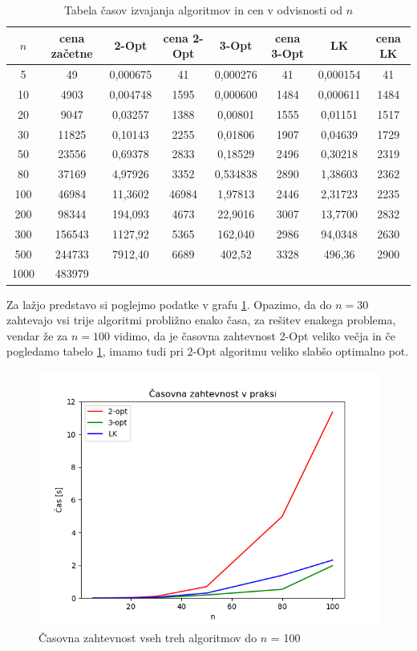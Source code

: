\documentclass[12pt, a4paper]{article}
\begin{document}
\begin{table}[!h]
\begin{tabular}{|c|c|c|c|c|c|c|c|}
\hline
$n$&cena začetne&2-Opt&cena 2-Opt&3-Opt&cena 3-Opt&LK&cena LK\\\hline
5&49&0,000675&41&0,000276&41&0,000154&41\\\hline
10&4903&0,004748&1595&0,000600&1484&0,000611&1484\\\hline
20&9047&0,03257&1388&0,00801&1555&0,01151&1517\\\hline
30&11825&0,10143&2255&0,01806&1907&0,04639&1729\\\hline
50&23556&0,69378&2833&0,18529&2496&0,30218&2319\\\hline
80&37169&4,97926&3352&0,534838&2890&1,38603&2362\\\hline
100&46984&11,3602&46984&1,97813&2446&2,31723&2235\\\hline
200&98344&194,093&4673&22,9016&3007&13,7700&2832\\\hline
300&156543&1127,92&5365&162,040&2986&94,0348&2630\\\hline
500&244733&7912,40&6689&402,52&3328&496,36&2900\\\hline
1000&483979&&&&&&\\\hline
\end{tabular}
\caption{Tabela časov izvajanja algoritmov in cen v odvisnosti od $n$}
\label{tabela_casov}
\end{table}

Za lažjo predstavo si poglejmo podatke v grafu \ref{casovna_do_100}. Opazimo, da do $n=30$ zahtevajo vsi trije algoritmi probližno enako časa, za rešitev enakega problema, vendar že za $n=100$ vidimo, da je časovna zahtevnost 2-Opt veliko večja in če pogledamo tabelo \ref{tabela_casov}, imamo tudi pri 2-Opt algoritmu veliko slabšo optimalno pot.

\begin{figure}[!h]
 \begin{center}
  \includegraphics[width=12 cm]{casovna_zahtevnost_do_100.png}
  \caption{Časovna zahtevnost vseh treh algoritmov do $n$ = 100}
  \label{casovna_do_100}
\end{center}
\end{figure}
\end{document}
